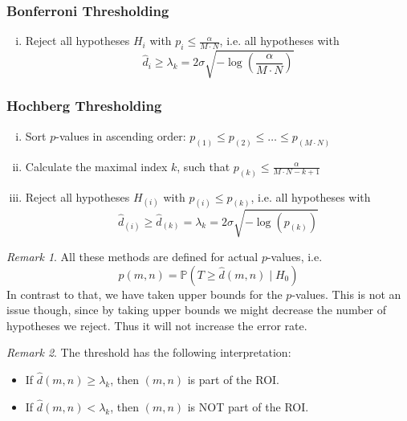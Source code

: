 \documentclass[a4paper,12pt]{article}
\theoremstyle{plain}
\theoremstyle{definition}
\theoremstyle{remark}
\newtheorem{remark}{Remark}
\begin{document}
\subsubsection{Bonferroni Thresholding}
\begin{enumerate}[(i)]
	\item Reject all hypotheses $H_{i}$ with $p_{i} \leq \frac{\alpha}{M \cdot N}$, i.e. all hypotheses with $$\hat{d}_{i} \geq \lambda_k = 2 \sigma \sqrt{- \log \left( \frac{\alpha}{M \cdot N} \right)}$$
\end{enumerate}

\subsubsection{Hochberg Thresholding}
\begin{enumerate}[(i)]
	\item Sort $p$-values in ascending order: $p_{(1)} \leq p_{(2)} \leq \dots \leq p_{(M \cdot N)}$
	\item Calculate the maximal index $k$, such that $p_{(k)} \leq \frac{\alpha}{M \cdot N - k + 1}$
	\item Reject all hypotheses $H_{(i)}$ with $p_{(i)} \leq p_{(k)}$, i.e. all hypotheses with $$\hat{d}_{(i)} \geq \hat{d}_{(k)} = \lambda_{k} = 2 \sigma \sqrt{- \log(p_{(k)})}$$
\end{enumerate}

\begin{remark}
	All these methods are defined for actual $p$-values, i.e.
	\begin{equation*}
	p(m, n) = \mathbb{P}(T \geq \hat{d}(m, n) \mid H_0)
	\end{equation*}
	In contrast to that, we have taken upper bounds for the $p$-values. This is not an issue though, since by taking upper bounds we might decrease the number of hypotheses we reject. Thus it will not increase the error rate.
\end{remark}

\begin{remark}
	The threshold has the following interpretation:
	\begin{itemize}
		\item If $\hat{d}(m, n) \geq \lambda_{k}$, then $(m, n)$ is part of the ROI.
		\item If $\hat{d}(m, n) < \lambda_{k}$, then $(m, n)$ is NOT part of the ROI.
	\end{itemize}
\end{remark}
\end{document}
